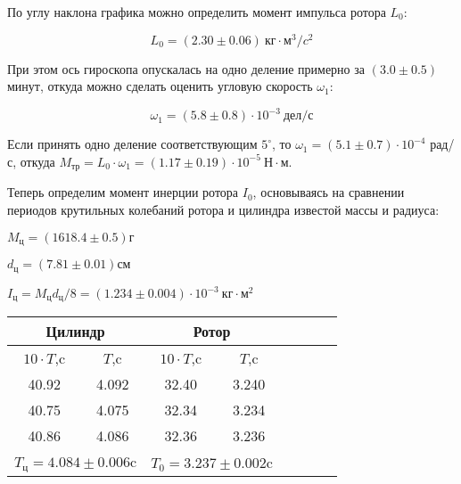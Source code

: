 \documentclass[14pt]{article}
\begin{document}
\begin{flushleft}
\end{flushleft}

\vspace{0.5cm}
По углу наклона графика можно определить момент импульса ротора $L_0$:

$$\boxed{L_0 = (2.30 \pm 0.06)~\text{кг}\cdot\text{м}^3/c^2}$$

При этом ось гироскопа опускалась на одно деление примерно за $(3.0 \pm 0.5)$ минут, откуда можно сделать оценить угловую скорость $\omega_1$:

$$\omega_1 = (5.8 \pm 0.8)\cdot 10^{-3}~\text{дел/с}$$

Если принять одно деление соответствующим $5^{\circ}$, то $\omega_1 = (5.1 \pm 0.7)\cdot 10^{-4}$ рад/с, откуда 
$M_{\text{тр}} = L_0 \cdot \omega_1 = (1.17 \pm 0.19)\cdot 10^{-5}~\text{Н}\cdot\text{м}$.

\vspace{0.5cm}
Теперь определим момент инерции ротора $I_0$, основываясь на сравнении периодов крутильных колебаний ротора и цилиндра известой массы и радиуса:

$M_\text{ц} = (1618.4 \pm 0.5)\text{г}$

$d_\text{ц} = (7.81  \pm 0.01)\text{см}$

$I_\text{ц} = M_\text{ц}d_\text{ц}/8 = (1.234 \pm 0.004) \cdot 10^{-3}~\text{кг}\cdot\text{м}^2$

\vspace{0.5cm}
\begin{center}
\begin{tabular}{|c|c|c|c|c|c|c|c|}
\hline
\multicolumn{2}{|c}{Цилиндр}		&	\multicolumn{2}{|c|}{Ротор}												\\
\hline
$10\cdot T$,c	&	$T$,c			&	$10\cdot T$,c	&	$T$,c												\\
\hline
40.92			&	4.092			&	32.40			&	3.240												\\
\hline
40.75			&	4.075			&	32.34			&	3.234												\\
\hline
40.86			&	4.086			&	32.36			&	3.236												\\
\hline
\multicolumn{2}{|c}{$T_\text{ц} = 4.084 \pm 0.006$c}	&	\multicolumn{2}{|c|}{$T_0 = 3.237 \pm 0.002$c}		\\
\hline
\end{tabular}
\end{center}
\end{document}

